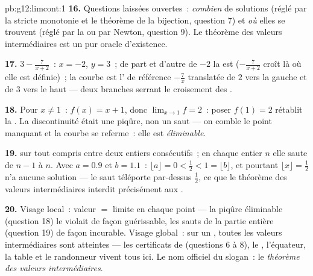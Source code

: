 \begin{solution}{pb:g12:limcont:1}
\textbf{16.} Questions laissées ouvertes~: \emph{combien} de
solutions (réglé par la stricte monotonie et le théorème de la
bijection, question 7) et \emph{où} elles se trouvent (réglé par la
 ou par Newton, question 9). Le théorème des valeurs
intermédiaires est un pur oracle d'existence.

\textbf{17.} $3 - \frac{7}{x + 2}$~: 
$x = -2$,  $y = 3$~; de part et d'autre de
$-2$ la  est  ($-\frac{7}{x+2}$ croît là où elle
est définie)~; la courbe est l' de référence $-\frac7x$
translatée de $2$ vers la gauche et de $3$ vers le haut --- deux
branches serrant le croisement des .

\textbf{18.} Pour $x \neq 1$~: $f(x) = x + 1$, donc
$\lim_{x \to 1} f = 2$~: poser $f(1) = 2$ rétablit la .
La discontinuité était une piqûre, non un saut --- on comble le
point manquant et la courbe se referme~: elle est
\emph{éliminable}.

\textbf{19.}  sur tout  compris entre deux entiers
consécutifs~; en chaque entier $n$ elle saute de $n - 1$ à $n$.
Avec $a = 0.9$ et $b = 1.1$~: $\lfloor a \rfloor = 0 < \frac12 <
1 = \lfloor b \rfloor$, et pourtant
$\lfloor x \rfloor = \frac12$ n'a aucune solution --- le saut
téléporte par-dessus $\frac12$, ce que le théorème des valeurs
intermédiaires interdit précisément aux  .

\textbf{20.} Visage local~: valeur $=$ limite en chaque point ---
la piqûre éliminable (question 18) le violait de façon guérissable,
les sauts de la partie entière (question 19) de façon incurable.
Visage global~: sur un , toutes les valeurs
intermédiaires sont atteintes --- les certificats de 
(questions 6 à 8), le , l'équateur, la table et le
randonneur vivent tous ici. Le nom officiel du slogan~: le
\emph{théorème des valeurs intermédiaires}.
\end{solution}
